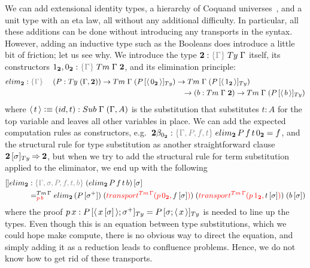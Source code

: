 \documentclass[a4paper,UKenglish,numberwithinsect,cleveref,thm-restate]{lipics-v2021}
\begin{document}
We can add extensional identity types, a hierarchy of Coquand universes~\cite{Coquand2018}, and a unit type with an eta law, all without any additional difficulty. In particular, all these additions can be done without introducing any transports in the syntax. However, adding an inductive type such as the Booleans does introduce a little bit of friction; let us see why.
We introduce the type $\bool : \implicit{\Gamma}\;\Ty\;\Gamma$ itself, its constructors $\btrue, \bfalse : \implicit{\Gamma}\;\Tm\;\Gamma\;\bool$, and its elimination principle:
%
\begin{alignat*}{3}
  \belim &: \implicit{\Gamma} \; && (P : \Ty\;(\Gamma , \bool)) \to \Tm\;\Gamma\;(\subTy{P}{\instSub{\bfalse}}) \to \Tm\;\Gamma\;(\subTy{P}{\instSub{\btrue}}) \\
  &&& \qquad\qquad\qquad\qquad\qquad\qquad\qquad\qquad\quad \to (b : \Tm\;\Gamma\;\bool) \to \Tm\;\Gamma\;(\subTy{P}{\instSub{b}})
\end{alignat*}
%
where $\instSub{t} \defeq (\idS, t) : \Sub\;\Gamma\;(\Gamma, A)$ is the substitution that substitutes $t : A$ for the top variable and leaves all other variables in place. We can add the expected computation rules 
%
%
as constructors, e.g.\ $ \bool\beta_{\bfalse} : \implicit{\Gamma, P, f, t}\; \belim\,P\,f\,t\,\bfalse = f$, and the structural rule for type substitution as another straightforward clause
$\subTy{\bool}{\sigma} \reduce \bool$,
but when we try to add the structural rule for term substitution applied to the eliminator, we end up with the following
%
\begin{alignat*}{5}
  []\belim & : \implicit{\Gamma, \sigma, P, f, t, b}\; \sub{(\belim\,P\,f\,t\,b)}{\sigma} \\
           & =^{\Tm\,\Gamma}_{\alert{p\,b}} \belim\,(\sub{P}{\sigma^+})\;(\alert{\transfib{\Tm\,\Gamma}{p\,\bfalse}{\textcolor{black}{\sub{f}{\sigma}}}})\;(\alert{\transfib{\Tm\,\Gamma}{p\,\btrue}{\textcolor{black}{\sub{t}{\sigma}}}})\; (\sub{b}{\sigma})
\end{alignat*}
where the proof $p\,x : \subTy{P}{\instSub{\sub{x}{\sigma}} ; \sigma^+} = \subTy{P}{\sigma ; \instSub{x}}$ is needed to line up the types. Even though this is an equation between type substitutions, which we could hope make compute, there is no obvious way to direct the equation, and simply adding it as a reduction leads to confluence problems. Hence, we do not know how to get rid of these transports.
\end{document}
